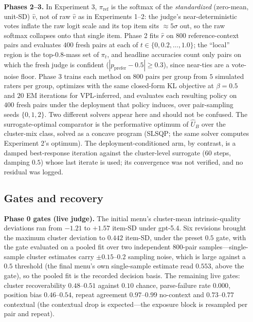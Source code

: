 ﻿\documentclass[11pt]{article}
\begin{document}
\textbf{Phases 2--3.} In Experiment 3, \(\pi_{\text{ref}}\) is the softmax of the \emph{standardized} (zero-mean, unit-SD) \(\hat v\), not of raw \(\hat v\) as in Experiments 1--2: the judge's near-deterministic votes inflate the raw logit scale and its top item sits \(\approx 5\sigma\) out, so the raw softmax collapses onto that single item. Phase 2 fits \(\hat r\) on \(800\) reference-context pairs and evaluates \(400\) fresh pairs at each of \(t \in \{0, 0.2, \dots, 1.0\}\); the ``local'' region is the top-\(0.8\)-mass set of \(\pi_t\), and headline accuracies count only pairs on which the fresh judge is confident (\(|p_{\text{prefer}} - 0.5| \geq 0.3\)), since near-ties are a vote-noise floor. Phase 3 trains each method on \(800\) pairs per group from \(5\) simulated raters per group, optimizes with the same closed-form KL objective at \(\beta = 0.5\) and \(20\) EM iterations for VPL-inferred, and evaluates each resulting policy on \(400\) fresh pairs under the deployment that policy induces, over pair-sampling seeds \(\{0, 1, 2\}\). Two different solvers appear here and should not be confused. The surrogate-optimal comparator is the performative optimum of \(\hat U_B\) over the cluster-mix class, solved as a concave program (SLSQP; the same solver computes Experiment 2's optimum). The deployment-conditioned arm, by contrast, is a damped best-response iteration against the cluster-level surrogate (\(60\) steps, damping \(0.5\)) whose last iterate is used; its convergence was not verified, and no residual was logged.

\subsection{Gates and recovery}

\textbf{Phase 0 gates (live judge).} The initial menu's cluster-mean intrinsic-quality deviations ran from \(-1.21\) to \(+1.57\) item-SD under gpt-5.4. Six revisions brought the maximum cluster deviation to \(0.442\) item-SD, under the preset \(0.5\) gate, with the gate evaluated on a pooled fit over two independent 800-pair samples---single-sample cluster estimates carry \(\pm 0.15\)--\(0.2\) sampling noise, which is large against a \(0.5\) threshold (the final menu's own single-sample estimate read \(0.553\), above the gate), so the pooled fit is the recorded decision basis. The remaining live gates: cluster recoverability \(0.48\)--\(0.51\) against \(0.10\) chance, parse-failure rate \(0.000\), position bias \(0.46\)--\(0.54\), repeat agreement \(0.97\)--\(0.99\) no-context and \(0.73\)--\(0.77\) contextual (the contextual drop is expected---the exposure block is resampled per pair and repeat).
\end{document}
